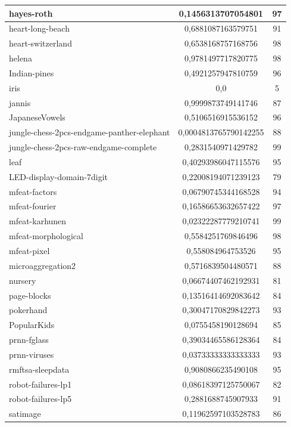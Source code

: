 \documentclass[times,specification,annotation]{itmo-student-thesis}
\begin{document}
\begin{center}
\begin{longtable}{ |m{5cm}|c|c| }
		\hline
		hayes-roth & 0,1456313707054801 & 97 \\
		\hline
		heart-long-beach & 0,6881087163579751 & 91 \\
		\hline
		heart-switzerland & 0,6538168757168756 & 98 \\
		\hline
		helena & 0,9781497717820775 & 98 \\
		\hline
		Indian-pines & 0,4921257947810759 & 96 \\
		\hline
		iris & 0,0 & 5 \\
		\hline
		jannis & 0,9999873749141746 & 87 \\
		\hline
		JapaneseVowels & 0,5106516915536152 & 96 \\
		\hline
		jungle-chess-2pcs-endgame-panther-elephant & 0,0004813765790142255 & 88 \\
		\hline
		jungle-chess-2pcs-raw-endgame-complete & 0,2831540971429782 & 99 \\
		\hline
		leaf & 0,40293986047115576 & 95 \\
		\hline
		LED-display-domain-7digit & 0,22008194071239123 & 79 \\
		\hline
		mfeat-factors & 0,06790745344168528 & 94 \\
		\hline
		mfeat-fourier & 0,16586653632657422 & 97 \\
		\hline
		mfeat-karhunen & 0,02322287779210741 & 99 \\
		\hline
		mfeat-morphological & 0,5584251769846496 & 98 \\
		\hline
		mfeat-pixel & 0,558084964753526 & 95 \\
		\hline
		microaggregation2 & 0,5716839504480571 & 88 \\
		\hline
		nursery & 0,06674407462192931 & 81 \\
		\hline
		page-blocks & 0,13516414692083642 & 84 \\
		\hline
		pokerhand & 0,30047170829842273 & 93 \\
		\hline
		PopularKids & 0,0755458190128694 & 85 \\
		\hline
		prnn-fglass & 0,39034465586128364 & 84 \\
		\hline
		prnn-viruses & 0,03733333333333333 & 93 \\
		\hline
		rmftsa-sleepdata & 0,9080866235490108 & 95 \\
		\hline
		robot-failures-lp1 & 0,08618397125750067 & 82 \\
		\hline
		robot-failures-lp5 & 0,2881688745907933 & 91 \\
		\hline
		satimage & 0,11962597103528783 & 86 \\

\end{longtable}
\end{center}
\end{document}
